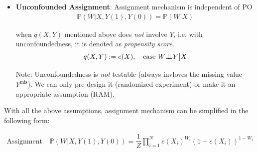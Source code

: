 \begin{itemize}[topsep=2pt,itemsep=0pt]
\begin{itemize}[topsep=2pt,itemsep=0pt]
        \item \textbf{Unconfounded Assignment}: Assignment mechanism is independent of PO
        \begin{align}
            \mathbb{P}(W|X,Y(1),Y(0))=\mathbb{P}(W|X)
        \end{align}

        when $ q(X,Y) $ mentioned above does \textit{not} involve $ Y $, i.e. with unconfoundedness, it is denoted as \textit{propensity score}.
        \begin{align}
            q(X,Y) := e(X),\quad \text{case } W\bot\!\!\!\bot Y\big| X
        \end{align}

        Note: Unconfoundedness is \textit{not} testable (always invloves the missing value $ Y^\mathrm{mis}  $). We can only pre-design it (randomized experiment) or make it an appropriate assumption (RAM).
    \end{itemize}
\end{itemize}


    
\begin{point}
    With all the above assumptions, assignment mechanism can be simplified in the following form:
\end{point}

\begin{align}
    \text{Assignment Mechanism:}\,&\mathbb{P}(W|X,Y(1),Y(0))=\dfrac{1}{Z}\prod_{i=1}^N e(X_i)^{W_i}(1-e(X_i))^{1-W_i}\\
\end{align}





